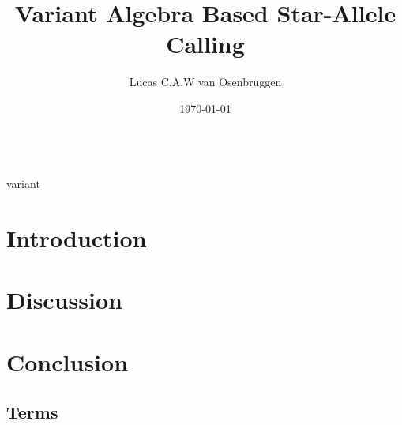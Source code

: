 \documentclass[a4paper, 10pt]{article}
\title{Variant Algebra Based Star-Allele Calling\\}
\author[1]{Lucas C.A.W van Osenbruggen}
\affil[1]{Leiden Institute of Advanced Computer Science, Leiden University}
\date{\today}
\begin{document}
%
\maketitle
\cite{Vis2023AVariants}\\
\Gls*{variant}
\thispagestyle{fancy}
\newpage
%
\begin{abstract}
    
\end{abstract}
\newpage
%
\section{Introduction}
\label{section:Introduction}

\newpage
%
%
\section{Discussion}
\label{section:Discussion}

\newpage
%
\section{Conclusion}
\label{section:Conclusion}

\newpage
%
\printbibliography
\newpage
%
\begin{appendix}
    \section{Terms}
    \label{appendix:Glossary}
    \printglossaries
\end{appendix}
%
\end{document}
